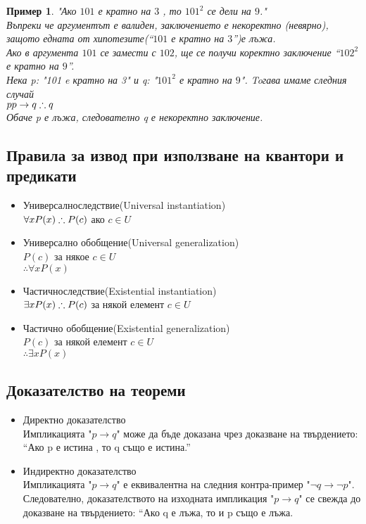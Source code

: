 \documentclass[fleqn, 12pt]{article}
\newtheorem{example}{Пример}[subsection]
\begin{document}
\begin{example}
"Ако $101$ е кратно на $3$ , то $101^2$ се дели на $9$." \\
Въпреки че аргументът е валиден, заключението е некоректно (невярно), защото едната от хипотезите(“$101$ е кратно на $3$”)е лъжа. \\
Ако в аргумента $101$ се замести с $102$, ще се получи коректно заключение “$102^2$ е кратно на $9$”.
\\ 
Нека p: "101 e кратно на 3" и q: "$101^2$ е кратно на $9$". Toгава имаме следния случай
\\
$p
\\ p \rightarrow q 
\\ \therefore q$
\\Обаче p е лъжа, следователно q е некоректно заключение. 
\end{example}

\subsection{Правила за извод при използване на квантори и предикати}

\begin{itemize}
	\item Универсалноследствие(Universal instantiation)
\\
$\forall x P(x) 
\\
\therefore P(c)$ ако $c \in U$
	\item Универсално обобщение(Universal generalization)
\\
$ P(c)$ за някое $c \in U$ 
\\
$\therefore\forall x P(x)$

	\item Частичноследствие(Existential instantiation)
\\
$\exists x P(x) 
\\
\therefore P(c)$ за някой елемент $c \in U$

	\item Частично обобщение(Existential generalization)
\\
$P(c)$ за някой елемент $c \in U$
\\
$\therefore \exists x P(x)  $
\end{itemize}

\subsection{Доказателство на теореми}
\begin{itemize}
	\item Директно доказателство \\
Импликацията "$p \rightarrow q$" може да бъде доказана чрез доказване на твърдението:\\
 “Ако p е истина , то q също е истина.”
	\item Индиректно доказателство \\
Импликацията "$p \rightarrow q$" е еквивалентна на следния контра-пример "$\neg q \rightarrow \neg p$". Следователно, доказателството на изходната импликация "$p \rightarrow q$" се свежда до доказване на твърдението: “Ако q е лъжа, то и p също е лъжа.
\end{itemize}
\end{document}
